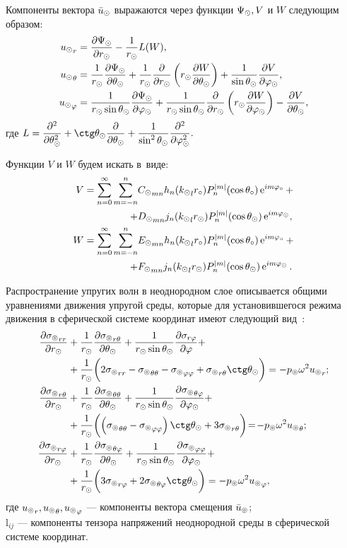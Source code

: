 Компоненты вектора $\bar{u}_\odot$ выражаются через функции $\Psi_\odot, V$ и $W$ следующим образом:
\begin{equation}\label{eq_us}
\begin{split}
{u_\odot}_r &= \frac{\partial \Psi_\odot}{\partial r_\odot} - \frac{1}{r_\odot}L(W),\\
{u_\odot}_\theta &= \frac{1}{r_\odot}\frac{\partial \Psi_\odot}{\partial \theta_\odot} + \frac{1}{r_\odot}\frac{\partial}{\partial r_\odot}\left(r_\odot\frac{\partial W}{\partial \theta_\odot}\right) + \frac{1}{\sin\theta_\odot}\frac{\partial V}{\partial\varphi_\odot},\\
{u_\odot}_\varphi &= \frac{1}{r_\odot \sin\theta_\odot}\frac{\partial \Psi_\odot}{\partial \varphi_\odot} + \frac{1}{r_\odot\sin\theta_\odot}\frac{\partial}{\partial r_\odot}\left(r_\odot\frac{\partial W}{\partial \varphi_\odot}\right) - \frac{\partial V}{\partial \theta_\odot},
\end{split}
\end{equation}
где $L = \df{\de^2}{\de\Q\s^2} + \ctg\Q\s\df{\de}{\de\Q\s} + \df{1}{\sin^2\Q\s}\df{\de^2}{\de\f\s^2}.$

Функции $V$ и $W$ будем искать в~виде:
\begin{align}
V = \sum\limits_{n=0}^\infty \sum\limits_{m=-n}^n &{C_\odot}_{mn} h_n({k_\odot}_lr_\circ)P_n^{\lvert m\rvert}(\cos\theta_\circ)\operatorname{e}^{im\varphi_\circ} + \notag\\
+ &{D_\odot}_{mn} j_n({k_\odot}_lr_\odot)P_n^{\lvert m\rvert}(\cos\theta_\odot)\operatorname{e}^{im\varphi_\odot},\label{eq_v}\\
W = \sum\limits_{n=0}^\infty \sum\limits_{m=-n}^n &{E_\odot}_{mn} h_n({k_\odot}_lr_\circ)P_n^{\lvert m\rvert}(\cos\theta_\circ)\operatorname{e}^{im\varphi_\circ} + \notag\\
+ &{F_\odot}_{mn} j_n({k_\odot}_lr_\odot)P_n^{\lvert m\rvert}(\cos\theta_\odot)\operatorname{e}^{im\varphi_\odot}.\label{eq_w}
\end{align}

Распространение упругих волн в неоднородном слое описывается общими уравнениями движения упругой среды, которые для установившегося режима движения в сферической системе координат имеют следующий вид~\cite{Nowacki}:
\begin{equation}\label{eq_moving}
\begin{split}
\fr{\de{\si\l}_{rr}}{\de r\s} &+ \fr1{r\s} \fr{\de{\si\l}_{r\Q}}{\de\Q\s} + \fr{1}{r\s\sin\Q\s}\fr{\de\si_{r\f}}{\de\f} +\\
&+ \fr1{r\s}\biggl(2{\si\l}_{rr}-{\si\l}_{\Q\Q}-{\si\l}_{\f\f}+{\si\l}_{r\Q}\ctg\Q\s\biggr)=-p\l\om^2{u\l}_r;\\
\fr{\de{\si\l}_{r\Q}}{\de r\s} &+ \fr1{r\s} \fr{\de{\si\l}_{\Q\Q}}{\de\Q\s} + \fr{1}{r\s\sin\Q\s}\fr{\de{\si\l}_{\Q\f}}{\de\f\s} +\\
&+ \fr1{r\s}\biggl(\left({\si\l}_{\Q\Q}-{\si\l}_{\f\f}\right)\ctg\Q\s+3{\si\l}_{r\Q}\biggr)\!=\!-p\l\om^2{u\l}_\Q;\\
\fr{\de{\si\l}_{r\f}}{\de r\s} &+ \fr1{r\s} \fr{\de{\si\l}_{\Q\f}}{\de\Q\s} + \fr{1}{r\s\sin\Q\s}\fr{\de{\si\l}_{\f\f}}{\de\f\s} +\\
&+ \fr1{r\s}\biggl(3{\si\l}_{r\f}+2{\si\l}_{\Q\f}\ctg\Q\s\biggr)=-p\l\om^2{u\l}_\f,
\end{split}
\end{equation}
где ${u_\circledcirc}_r, {u_\circledcirc}_\theta, {u_\circledcirc}_\varphi$ --- компоненты вектора смещения $\bar{u}_\circledcirc$;\\
${\si\l}_{ij}$ --- компоненты тензора напряжений неоднородной среды в сферической системе координат.


